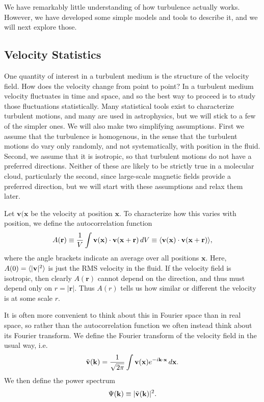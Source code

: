 We have remarkably little understanding of how turbulence actually works. However, we have developed some simple models and tools to describe it, and we will next explore those.

\subsection{Velocity Statistics}

One quantity of interest in a turbulent medium is the structure of the velocity field. How does the velocity change from point to point?  In a turbulent medium velocity fluctuates in time and space, and so the best way to proceed is to study those fluctuations statistically. Many statistical tools exist to characterize turbulent motions, and many are used in astrophysics, but we will stick to a few of the simpler ones. We will also make two simplifying assumptions. First we assume that the turbulence is homogenous, in the sense that the turbulent motions do vary only randomly, and not systematically, with position in the fluid. Second, we assume that it is isotropic, so that turbulent motions do not have a preferred directions. Neither of these are likely to be strictly true in a molecular cloud, particularly the second, since large-scale magnetic fields provide a preferred direction, but we will start with these assumptions and relax them later.

Let $\mathbf{v}(\mathbf{x}$ be the velocity at position $\mathbf{x}$. To characterize how this varies with position, we define the autocorrelation function
\begin{equation}
A(\mathbf{r})\equiv \frac{1}{V} \int \mathbf{v}(\mathbf{x})\cdot \mathbf{v}(\mathbf{x}+\mathbf{r}) \, dV \equiv \langle \mathbf{v}(\mathbf{x}) \cdot \mathbf{v}(\mathbf{x}+\mathbf{r})\rangle,
\end{equation}
where the angle brackets indicate an average over all positions $\mathbf{x}$. Here, $A(0) = \langle|\mathbf{v}|^2\rangle$ is just the RMS velocity in the fluid. If the velocity field is isotropic, then clearly $A(\mathbf{r})$ cannot depend on the direction, and thus must depend only on $r=|\mathbf{r}|$. Thus $A(r)$ tells us how similar or different the velocity is at some scale $r$.

It is often more convenient to think about this in Fourier space than in real space, so rather than the autocorrelation function we often instead think about its Fourier transform. We define the Fourier transform of the velocity field in the usual way, i.e.\
\begin{equation}
\tilde{\mathbf{v}}(\mathbf{k}) = \frac{1}{\sqrt{2\pi}}\int \mathbf{v}(\mathbf{x}) e^{-i\mathbf{k}\cdot\mathbf{x}} \,d\mathbf{x}.
\end{equation}
We then define the power spectrum
\begin{equation}
\Psi(\mathbf{k}) \equiv | \tilde{\mathbf{v}}(\mathbf{k})|^2.
\end{equation}

